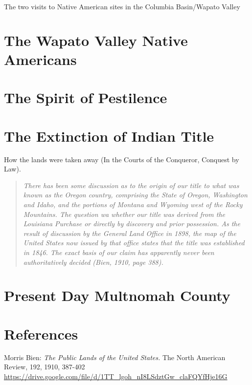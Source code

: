 \documentclass[
  12pt,
]{book}
\begin{document}
The two visits to Native American sites in the Columbia Basin/Wapato Valley

\hypertarget{the-wapato-valley-native-americans}{%
\section{The Wapato Valley Native Americans}\label{the-wapato-valley-native-americans}}

\hypertarget{the-spirit-of-pestilence}{%
\section{The Spirit of Pestilence}\label{the-spirit-of-pestilence}}

\hypertarget{the-extinction-of-indian-title}{%
\section{The Extinction of Indian Title}\label{the-extinction-of-indian-title}}

How the lands were taken away (In the Courts of the Conqueror, Conquest by Law).

\begin{quote}
\emph{There has been some discussion as to the origin of our title to what was known as the Oregon country, comprising the State of Oregon, Washington and Idaho, and the portions of Montana and Wyoming west of the Rocky Mountains. The question wa whether our title was derived from the Louisiana Purchase or directly by discovery and prior possession. As the result of discussion by the General Land Office in 1898, the map of the United States now issued by that office states that the title was established in 1846. The exact basis of our claim has apparently never been authoritatively decided (Bien, 1910, page 388).}
\end{quote}

\hypertarget{present-day-multnomah-county}{%
\section{Present Day Multnomah County}\label{present-day-multnomah-county}}

\hypertarget{references-1}{%
\section{References}\label{references-1}}

Morris Bien: \emph{The Public Lands of the United States.}
The North American Review, 192, 1910, 387-402
\url{https://drive.google.com/file/d/1TT_lgoh_nI8LSdztGw_claFQYfHje16G}
\end{document}
